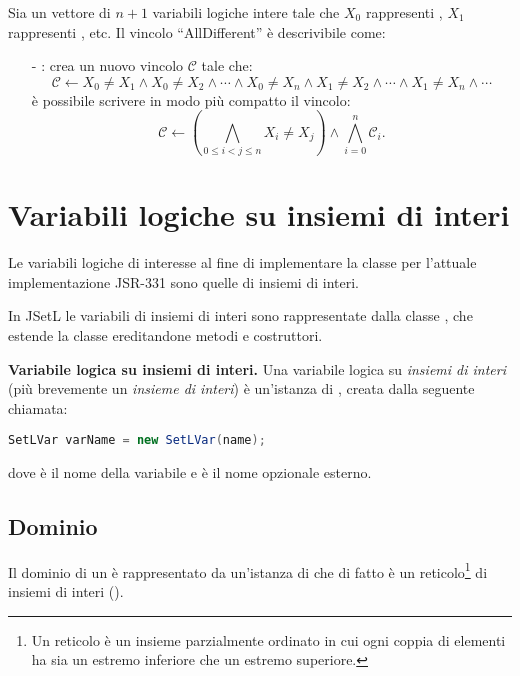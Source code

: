 Sia  un vettore di $n+1$ variabili logiche intere tale che $X_0$
rappresenti , $X_1$ rappresenti , etc.
Il vincolo ``AllDifferent'' è descrivibile come:
\begin{itemize}
\item[-]: crea un nuovo vincolo 
$\mathcal{C}$ tale che:
\[
\mathcal{C} \leftarrow X_0 \neq X_1 \wedge X_0 \neq X_2 \wedge \cdots \wedge X_0
\neq X_n \wedge X_1 \neq X_2 \wedge \cdots \wedge X_1 \neq X_n \wedge \cdots
\]
è possibile scrivere in modo più compatto il vincolo:
\[
\mathcal{C} \leftarrow \left(\bigwedge_{0 \leq i < j \leq n} X_i \neq X_j\right)
\wedge \bigwedge_{i = 0}^{n}\mathcal{C}_i.
\]
\end{itemize}

\section{Variabili logiche su insiemi di interi}
Le variabili logiche di interesse al fine di implementare la classe 
 per l'attuale implementazione JSR-331 sono
quelle di insiemi di interi. 

In JSetL le variabili di insiemi di interi sono rappresentate dalla classe
, che estende la classe  ereditandone metodi e 
costruttori.

\begin{flushleft}\textbf{Variabile logica su insiemi di interi.}
Una variabile logica su \emph{insiemi di interi} (più brevemente un 
\emph{insieme di interi}) è un'istanza di
, 
creata dalla seguente chiamata:
\begin{center}
\lstinline[language = Java]!SetLVar varName = new SetLVar(name);!
\end{center}
dove   è il nome della variabile e  è il nome
opzionale esterno.
\end{flushleft}

\subsection{Dominio}
Il dominio di un  è rappresentato da un'istanza di
 che di fatto è un reticolo\footnote{Un reticolo è un 
insieme parzialmente ordinato in cui ogni coppia di elementi ha sia un estremo 
inferiore che un estremo superiore.} di insiemi di interi 
().

